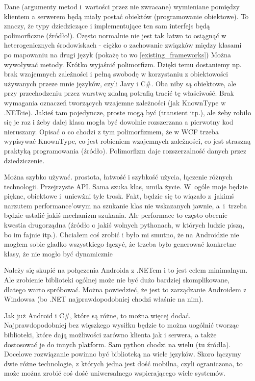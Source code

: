 \begin{description}
Dane (argumenty metod i~wartości przez nie zwracane) wymieniane pomiędzy klientem a serwerem będą miały postać obiektów (programowanie obiektowe). To znaczy, że typy dziedziczące i implementujące ten sam interfejs będą polimorficzne (źródło!). Często normalnie nie jest tak łatwo to osiągnąć w heterogenicznych środowiskach - ciężko o zachowanie związków między klasami po mapowaniu na drugi język (pokażę to wo \ref{existing_frameworks})
 Można wywoływać metody. Krótko wyjaśnić polimorfizm.
Dzięki temu dostaniemy np. brak wzajemnych zależności i pełną swobodę w korzystaniu z obiektowości używanych przeze mnie języków, czyli Javy i C\#. Oba niby są obiektowe, ale przy przechodzeniu przez warstwę zdalną potrafią tracić tę właściwość. Brak wymagania oznaczeń tworzących wzajemne zależności (jak KnownType w .NETcie). Jakieś tam pojedyncze, proste mogą być (transient itp.), ale żeby robiło się je raz i żeby dalej klasa mogła być dowolnie rozszerzana a pierwotny kod nieruszany. Opisać o co chodzi z tym polimorfizmem, że w WCF trzeba wypisywać KnownType, co jest robieniem wzajemnych zależności, co jest straszną praktyką programowania (źródło). Polimorfizm daje rozszerzalność danych przez dziedziczenie.

Można szybko używać. prostota, łatwość i szybkość użycia, łączenie różnych technologii. Przejrzyste API. Sama szuka klas, umila życie. W~ogóle moje będzie piękne, obiektowe i~uniewżni tyle trosk. Fakt, będzie się to wiązało z~jakimś narzutem performance'owym na szukanie klas nie wskazanych jawnie, a~i~trzeba będzie ustalić jakiś mechanizm szukania. Ale performace to często obecnie kwestia drugorządna (źródło o jakiś wolnych pythonach, w których ludzie piszą, bo im fajnie itp.). Chciałem coś zrobić i było mi smutno, że na Androidzie nie mogłem sobie gladko wszystkiego łączyć, że trzeba było generować konkretne klasy, że nie mogło być dynamicznie

Należy się skupić na połączenia Androida z .NETem i to jest celem minimalnym. Ale zrobienie biblioteki ogólnej może nie być dużo bardziej skomplikowane, dlatego warto spróbować. Można powiedzieć, że jest to zarządzanie Androidem z Windowsa (bo .NET najprawdopodobniej chodzi właśnie na nim).

Jak już Android i C\#, które są różne, to można więcej dodać. Najprawdopodobniej bez więszkego wysiłku będzie to można uogólnić tworząc biblioteki, które dają możliwości zarówno klienta jak i serwera, a także dostosować je do innych platform. Sam python chodzi na wielu (tu źródła). Docelowe rozwiązanie powinno być biblioteką na wiele języków. Skoro łączymy dwie różne technologie, z których jedna jest dość mobilna, czyli ograniczona, to może można zrobić coś dość uniwersalnego wspierającego wiele systemów. 
\end{description}

